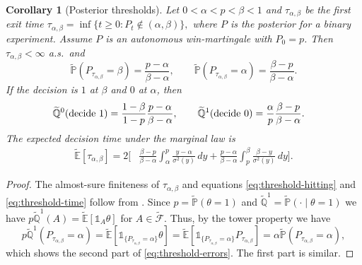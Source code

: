 \documentclass[11pt, reqno]{amsart}
\theoremstyle{plain}
\newtheorem{corollary}[theorem]{Corollary}
\theoremstyle{remark}
\numberwithin{equation}{section}
\begin{document}
\begin{corollary}[Posterior thresholds]\label{cor:thresholds}
    Let $0<\alpha<p<\beta<1$ and $\tau_{\alpha,\beta}$ be the first exit time
    \(
        \tau_{\alpha,\beta}
        =\inf\{t\geq 0:P_t\notin(\alpha,\beta)\},
    \)
    where $P$ is the posterior for a binary experiment. Assume $P$ is an autonomous win-martingale with $P_0=p$. Then $\tau_{\alpha,\beta}<\infty$ a.s.~and
    \begin{equation}\label{eq:threshold-hitting}
        \widetilde{\mathbb P}(P_{\tau_{\alpha,\beta}}=\beta)
        =\frac{p-\alpha}{\beta-\alpha},
        \qquad
        \widetilde{\mathbb P}(P_{\tau_{\alpha,\beta}}=\alpha)
        =\frac{\beta-p}{\beta-\alpha}.
    \end{equation}
    If the decision is $1$ at $\beta$ and $0$ at $\alpha$, then
    \begin{align}
        \widetilde{\mathbb Q}^0(\textnormal{decide }1)
        &=\frac{1-\beta}{1-p}\frac{p-\alpha}{\beta-\alpha},
        \qquad
        \widetilde{\mathbb Q}^1(\textnormal{decide }0)
        =\frac{\alpha}{p}\frac{\beta-p}{\beta-\alpha}.
    \label{eq:threshold-errors}
    \end{align}
    The expected decision time under the marginal law is
    \begin{align}
        \widetilde{\mathbb E}[\tau_{\alpha,\beta}]
        =2\bigg[&
        \frac{\beta-p}{\beta-\alpha}
        \int_\alpha^p\frac{y-\alpha}{\sigma^2(y)}\,dy
        +\frac{p-\alpha}{\beta-\alpha}
        \int_p^\beta\frac{\beta-y}{\sigma^2(y)}\,dy
        \bigg].
    \label{eq:threshold-time}
    \end{align}
\end{corollary}

\begin{proof}
    The almost-sure finiteness of $\tau_{\alpha,\beta}$ and equations \eqref{eq:threshold-hitting} and \eqref{eq:threshold-time} follow from \cite[Section 5.5.C]{karatzas-shreve}. Since $p=\widetilde{\mathbb P}(\theta=1)$ and $\widetilde{\mathbb Q}^1=\widetilde{\mathbb P}(\cdot\mid\theta=1)$ we have $p\widetilde{\mathbb Q}^1(A)=\widetilde{\mathbb E}[\mathbb 1_{A}\theta]$ for $A\in\widetilde{\mathcal{F}}$. Thus, by the tower property we have
    \begin{equation*}
        p\widetilde{\mathbb Q}^1(P_{\tau_{\alpha,\beta}}=\alpha)=\widetilde{\mathbb E}[\mathbb 1_{\{P_{\tau_{\alpha,\beta}}=\alpha\}}\theta]=\widetilde{\mathbb E}[\mathbb 1_{\{P_{\tau_{\alpha,\beta}}=\alpha\}}P_{\tau_{\alpha,\beta}}]=\alpha\widetilde{\mathbb P}(P_{\tau_{\alpha,\beta}}=\alpha),
    \end{equation*}
    which shows the second part of \eqref{eq:threshold-errors}. The first part is similar.
\end{proof}
\end{document}
